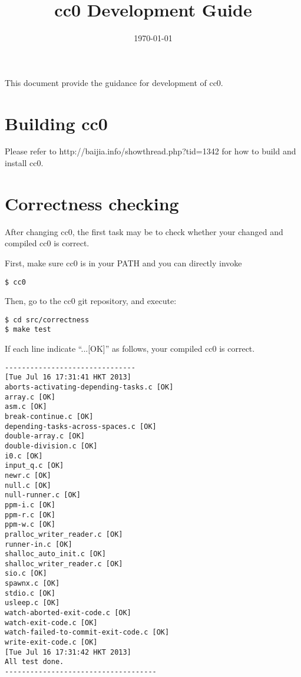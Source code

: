 \documentclass[10pt]{article}
\title{cc0 Development Guide}
\author{
}
\date{\today}
\begin{document}
\maketitle


This document provide the guidance for development of cc0.

\section{Building cc0}

Please refer to http://baijia.info/showthread.php?tid=1342 for how to build and install cc0. 

\section{Correctness checking}

After changing cc0, the first task may be to check whether your changed and compiled cc0 is correct.

First, make sure cc0 is in your PATH and you can directly invoke

\begin{verbatim}
$ cc0
\end{verbatim}

Then, go to the cc0 git repository, and execute:

\begin{verbatim}
$ cd src/correctness
$ make test
\end{verbatim}

If each line indicate ``...[OK]'' as follows, your compiled cc0 is correct.

\begin{verbatim}
-------------------------------
[Tue Jul 16 17:31:41 HKT 2013] 
aborts-activating-depending-tasks.c [OK]
array.c [OK]
asm.c [OK]
break-continue.c [OK]
depending-tasks-across-spaces.c [OK]
double-array.c [OK]
double-division.c [OK]
i0.c [OK]
input_q.c [OK]
newr.c [OK]
null.c [OK]
null-runner.c [OK]
ppm-i.c [OK]
ppm-r.c [OK]
ppm-w.c [OK]
pralloc_writer_reader.c [OK]
runner-in.c [OK]
shalloc_auto_init.c [OK]
shalloc_writer_reader.c [OK]
sio.c [OK]
spawnx.c [OK]
stdio.c [OK]
usleep.c [OK]
watch-aborted-exit-code.c [OK]
watch-exit-code.c [OK]
watch-failed-to-commit-exit-code.c [OK]
write-exit-code.c [OK]
[Tue Jul 16 17:31:42 HKT 2013] 
All test done.
------------------------------------
\end{verbatim}
\end{document}
